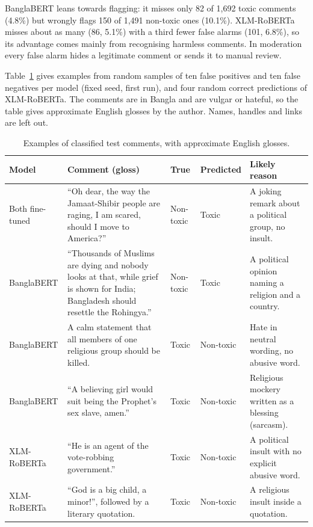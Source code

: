 BanglaBERT leans towards flagging: it misses only 82 of 1,692 toxic comments (4.8\%) but wrongly flags 150 of 1,491 non-toxic ones (10.1\%). XLM-RoBERTa misses about as many (86, 5.1\%) with a third fewer false alarms (101, 6.8\%), so its advantage comes mainly from recognising harmless comments. In moderation every false alarm hides a legitimate comment or sends it to manual review.

Table~\ref{tab:errors} gives examples from random samples of ten false positives and ten false negatives per model (fixed seed, first run), and four random correct predictions of XLM-RoBERTa. The comments are in Bangla and are vulgar or hateful, so the table gives approximate English glosses by the author. Names, handles and links are left out.

\begin{table}[H]
  \centering
  \caption[Examples of classified comments]{Examples of classified test comments, with approximate English glosses.}
  \label{tab:errors}
  \scriptsize
  \begin{tabularx}{\textwidth}{>{\raggedright\arraybackslash}p{1.7cm} >{\raggedright\arraybackslash}X >{\raggedright\arraybackslash}p{1.2cm} >{\raggedright\arraybackslash}p{1.2cm} >{\raggedright\arraybackslash}X}
    \toprule
    \textbf{Model} & \textbf{Comment (gloss)} & \textbf{True} & \textbf{Predicted} & \textbf{Likely reason} \\
    \midrule
    Both fine-tuned & ``Oh dear, the way the Jamaat-Shibir people are raging, I am scared, should I move to America?'' & Non-toxic & Toxic & A joking remark about a political group, no insult. \\
    BanglaBERT & ``Thousands of Muslims are dying and nobody looks at that, while grief is shown for India; Bangladesh should resettle the Rohingya.'' & Non-toxic & Toxic & A political opinion naming a religion and a country. \\
    BanglaBERT & A calm statement that all members of one religious group should be killed. & Toxic & Non-toxic & Hate in neutral wording, no abusive word. \\
    BanglaBERT & ``A believing girl would suit being the Prophet's sex slave, amen.'' & Toxic & Non-toxic & Religious mockery written as a blessing (sarcasm). \\
    XLM-RoBERTa & ``He is an agent of the vote-robbing government.'' & Toxic & Non-toxic & A political insult with no explicit abusive word. \\
    XLM-RoBERTa & ``God is a big child, a minor!'', followed by a literary quotation. & Toxic & Non-toxic & A religious insult inside a quotation. \\

\end{tabularx}
\end{table}
